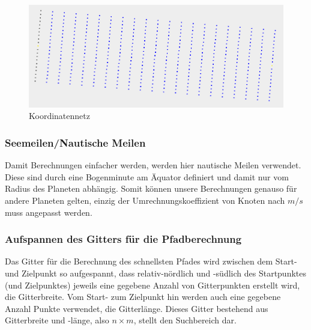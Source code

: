 \begin{figure}[h!]
\centering
\includegraphics[width=1\linewidth]{img/gridNet}
\caption{Koordinatennetz}
\label{gridnet}
\end{figure}

\subsubsection{Seemeilen/Nautische Meilen} Damit Berechnungen einfacher werden, werden
hier nautische Meilen verwendet. Diese sind durch eine Bogenminute am Äquator
definiert und damit nur vom Radius des Planeten abhängig. Somit können unsere
Berechnungen genauso für andere Planeten gelten, einzig der
Umrechnungskoeffizient von Knoten nach $m/s$ muss angepasst werden.

\subsubsection{Aufspannen des Gitters für die Pfadberechnung} Das Gitter für die
Berechnung des schnellsten Pfades wird zwischen dem Start- und Zielpunkt so
aufgespannt, dass relativ-nördlich und -südlich des Startpunktes (und
Zielpunktes) jeweils eine gegebene Anzahl von Gitterpunkten erstellt wird, die
Gitterbreite. Vom Start- zum Zielpunkt hin werden auch eine gegebene Anzahl
Punkte verwendet, die Gitterlänge. Dieses Gitter bestehend aus Gitterbreite und
-länge, also $n\times m$, stellt den Suchbereich dar.

